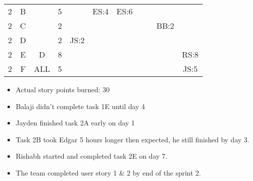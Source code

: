\documentclass[12pt]{article}
\begin{document}
\begin{table}[H]
\begin{tabular}{@{}c|c|c|c|ccccccc@{}}
2     & B    &            & 5                                                      &                                                 & ES:4                                            & ES:6                                             &                                                  &                                                  &                                                  &                                                  \\
2     & C    &            & 2                                                      &                                                 &                                                 &                                                  &                                                  &                                                  & BB:2                                             &                                                  \\
2     & D    &            & 2                                                      & JS:2                                            &                                                 &                                                  &                                                  &                                                  &                                                  &                                                  \\ 
2     & E    & D          & 8                                                      &                                                 &                                                 &                                                  &                                                  &                                                  &                                                  & RS:8                                             \\ 
2     & F    & ALL        & 5                                                      &                                                 &                                                 &                                                  &                                                  &                                                  &                                                  & JS:5                                             \\ \bottomrule
\end{tabular}
\end{table}

\begin{itemize}%
\item Actual story points burned: 30
\item Balaji didn't complete task 1E until day 4
\item Jayden finished task 2A early on day 1
\item Task 2B took Edgar 5 hours longer then expected, he still finished by day 3.
\item Rishabh started and completed task 2E on day 7.
\item The team completed user story 1 \& 2 by end of the sprint 2. 
\end{itemize}
\end{document}
